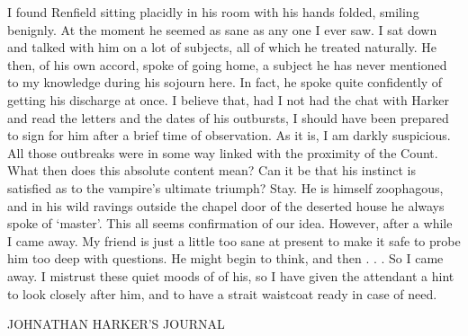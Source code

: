 I found Renfield sitting placidly in his room with his hands folded, smiling benignly. At the moment he seemed as sane as any one I ever saw. I sat down and talked with him on a lot of subjects, all of which he treated naturally. He then, of his own accord, spoke of going home, a subject he has never mentioned to my knowledge during his sojourn here. In fact, he spoke quite confidently of getting his discharge at once. I believe that, had I not had the chat with Harker and read the letters and the dates of his outbursts, I should have been prepared to sign for him after a brief time of observation. As it is, I am darkly suspicious. All those outbreaks were in some way linked with the proximity of the Count. What then does this absolute content mean? Can it be that his instinct is satisfied as to the vampire's ultimate triumph? Stay. He is himself zoophagous, and in his wild ravings outside the chapel door of the deserted house he always spoke of `master'. This all seems confirmation of our idea. However, after a while I came away. My friend is just a little too sane at present to make it safe to probe him too deep with questions. He might begin to think, and then . . . So I came away. I mistrust these quiet moods of of his, so I have given the attendant a hint to look closely after him, and to have a strait waistcoat ready in case of need. 

JOHNATHAN HARKER'S JOURNAL 

